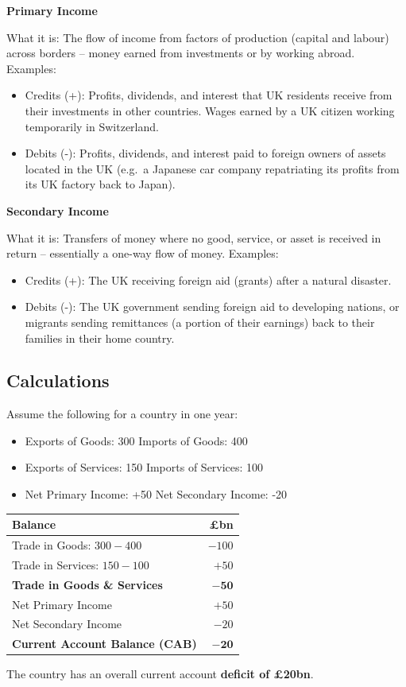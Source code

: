 \documentclass[11pt, a4paper, twoside]{book}
\begin{document}
\textbf{Primary Income}

What it is: The flow of income from factors of production (capital and labour) across borders -- money earned from investments or by working abroad. Examples:
\begin{itemize}
  \item Credits (+): Profits, dividends, and interest that UK residents receive from their investments in other countries. Wages earned by a UK citizen working temporarily in Switzerland.
  \item Debits (-): Profits, dividends, and interest paid to foreign owners of assets located in the UK (e.g.\ a Japanese car company repatriating its profits from its UK factory back to Japan).
\end{itemize}

\textbf{Secondary Income}

What it is: Transfers of money where no good, service, or asset is received in return -- essentially a one-way flow of money. Examples:
\begin{itemize}
  \item Credits (+): The UK receiving foreign aid (grants) after a natural disaster.
  \item Debits (-): The UK government sending foreign aid to developing nations, or migrants sending remittances (a portion of their earnings) back to their families in their home country.
\end{itemize}

\subsection{Calculations}

\begin{example}
Assume the following for a country in one year:
\begin{itemize}
  \item Exports of Goods: 300 \quad Imports of Goods: 400
  \item Exports of Services: 150 \quad Imports of Services: 100
  \item Net Primary Income: +50 \quad Net Secondary Income: -20
\end{itemize}

\medskip
\begin{tabular}{@{}lr@{}}
\textbf{Balance} & \textbf{£bn} \\
\midrule
Trade in Goods: $300 - 400$ & $-100$ \\
Trade in Services: $150 - 100$ & $+50$ \\
\textbf{Trade in Goods \& Services} & $\mathbf{-50}$ \\
Net Primary Income & $+50$ \\
Net Secondary Income & $-20$ \\
\midrule
\textbf{Current Account Balance (CAB)} & $\mathbf{-20}$ \\
\end{tabular}

\medskip
The country has an overall current account \textbf{deficit of £20bn}.
\end{example}
\end{document}
